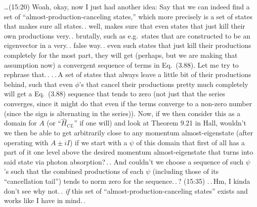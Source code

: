 \documentclass{report}
\begin{document}
\ldots (15:20) Woah, okay, now I just had another idea: Say that we can indeed find a set of ``almost-production-canceling states,'' which more precisely is a set of states that makes sure all states.\,. well, makes sure that even states that just kill their own productions very.\,. brutally, such as e.g.\ states that are constructed to be an eigenvector in a very.\,. false way.\,. even such states that just kill their productions completely for the most part, they will get (perhaps, but we are making that assumption now) a convergent sequence of terms in Eq.\ (3.88). Let me try to rephrase that.\,. .\,.\,A set of states that always leave a little bit of their productions behind, such that even $\phi$'s that cancel their productions pretty much completely will get a Eq.\ (3.88) sequence that tends to zero (not just that the series converges, since it might do that even if the terms converge to a non-zero number (since the sign is alternating in the series)). Now, if we then consider this as a domain for $A$ (or ``$\hat H_{CL}$'' if one will) and look at Theorem 9.21 in Hall, wouldn't we then be able to get arbitrarily close to any momentum almost-eigenstate (after operating with $A \pm i I$) if we start with a $\psi$ of this domain that first of all has a part of it one level above the desired momentum almost-eigenstate that turns into said state via photon absorption?\,.\,. And couldn't we choose a sequence of such $\psi$'s such that the combined productions of each $\psi$ (including those of its ``cancellation tail'') tends to norm zero for the sequence.\,.\,? (15:35) .\,.\,Hm, I kinda don't see why not.\,. \emph{if} this set of ``almost-production-canceling states'' exists and works like I have in mind.\,. %
\end{document}
